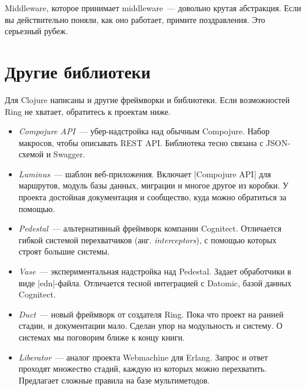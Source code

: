 Middleware, которое принимает middleware~--- довольно крутая абстракция. Если вы
действительно поняли, как оно работает, примите поздравления. Это серьезный
рубеж.

\section{Другие библиотеки}

Для Clojure написаны и другие фреймворки и библиотеки. Если возможностей Ring не
хватает, обратитесь к проектам ниже.

\begin{itemize}

\item
  \emph{Compojure API}~---
  убер-надстройка над обычным Compojure. Набор макросов, чтобы описывать REST
  API. Библиотека тесно связана с JSON-схемой и Swagger.

\item
  \emph{Luminus}~--- шаблон
  веб-приложения. Включает \spverb|Compojure API| для маршрутов, модуль базы
  данных, миграции и многое другое из коробки. У проекта достойная документация
  и сообщество, куда можно обратиться за помощью.

\item
  \emph{Pedestal}~---
  альтернативный фреймворк компании Cognitect. Отличается гибкой системой
  перехватчиков (анг. \emph{interceptors}), с помощью которых строят большие
  системы.

\item
  \emph{Vase}~---
  экспериментальная надстройка над Pedestal. Задает обработчики в виде
  \spverb|edn|-файла. Отличается тесной интеграцией с Datomic, базой данных
  Cognitect.

\item
  \emph{Duct}~--- новый
  фреймворк от создателя Ring. Пока что проект на ранней стадии, и документации
  мало. Сделан упор на модульность и систему. О системах мы поговорим ближе к
  концу книги.

\item
  \emph{Liberator}~---
  аналог проекта Webmachine для Erlang. Запрос и ответ проходят множество
  стадий, каждую из которых можно перехватить. Предлагает сложные правила на
  базе мультиметодов.

\end{itemize}

